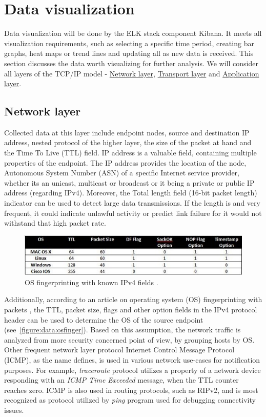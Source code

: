 \documentclass[12pt,a4paper,twoside]{report}
\begin{document}
	\section{Data visualization} \label{analysis:data}
		Data visualization will be done by the ELK stack component Kibana. It meets all visualization requirements, such as selecting a specific time period, creating bar graphs, heat maps or trend lines and updating all as new data is received. This section discusses the data worth visualizing for further analysis. We will consider all layers of the TCP/IP model - \hyperref[analysis:data:network]{Network layer}, \hyperref[analysis:data:transport]{Transport layer} and \hyperref[analysis:data:application]{Application layer}.
		\subsection{Network layer} \label{analysis:data:network}
			Collected data at this layer include endpoint nodes, source and destination IP address, nested protocol of the higher layer, the size of the packet at hand and the Time To Live (TTL) field. IP address is a valuable field, containing multiple properties of the endpoint. The IP address provides the location of the node, Autonomous System Number (ASN) of a specific Internet service provider, whether its an unicast, multicast or broadcast or it being a private or public IP address (regarding IPv4). Moreover, the Total length field (16-bit packet length) indicator can be used to detect large data transmissions. If the length is and very frequent, it could indicate unlawful activity or predict link failure for it would not withstand that high packet rate.\par
			\begin{figure}[h]
				\centering
				\includegraphics[scale=0.7]{osfingerprinting}
				\caption{OS fingerprinting with known IPv4 fields \cite{web:osfinger}.}
				\label{figure:data:osfinger}
			\end{figure}
			Additionally, according to an article on operating system (OS) fingerprinting with packets \cite{web:osfinger}, the TTL, packet size, flags and other option fields in the IPv4 protocol header can be used to determine the OS of the source endpoint (see~\autoref{figure:data:osfinger}). Based on this assumption, the network traffic is analyzed from more security concerned point of view, by grouping hosts by OS.
			Other frequent network layer protocol Internet Control Message Protocol (ICMP), as the name defines, is used in various network use-cases for notification purposes. For example, \emph{traceroute} protocol utilizes a property of a network device responding with an \emph{ICMP Time Exceeded} message, when the TTL counter reaches zero. ICMP is also used in routing protocols, such as RIPv2, and is most recognized as protocol utilized by \emph{ping} program used for debugging connectivity issues.
\end{document}
